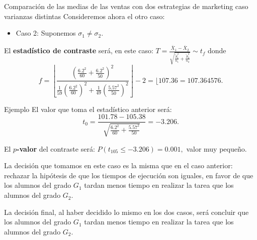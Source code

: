 \documentclass[
  ignorenonframetext,
]{beamer}
\providecommand{\tightlist}{%
  \setlength{\itemsep}{0pt}\setlength{\parskip}{0pt}}
\begin{document}
\begin{frame}{Comparación de las medias de las ventas con dos
estrategias de marketing caso varianzas distintas}
\protect\hypertarget{comparaciuxf3n-de-las-medias-de-las-ventas-con-dos-estrategias-de-marketing-caso-varianzas-distintas}{}
Consideremos ahora el otro caso:

\begin{itemize}
\tightlist
\item
  Caso 2: Suponemos \(\sigma_1\neq \sigma_2\).
\end{itemize}

El \textbf{estadístico de contraste} será, en este caso:
\(T=\frac{\overline{X}_1-\overline{X}_2}{\sqrt{\frac{\widetilde{S}_1^2}{n_1}+\frac{\widetilde{S}_2^2}{n_2}}}\sim t_f\)
donde \[
f=\left\lfloor\frac{ \left( \frac{6.2^2}{60}+\frac{6.2^2}{50}\right)^2}
{\frac1{59}\left(\frac{6.2^2}{60}\right)^2+\frac1{49}\left(\frac{5.57^2}{50}\right)^2}\right\rfloor -2
=\lfloor 107.36=107.364576.
\]
\end{frame}

\begin{frame}{Ejemplo}
\protect\hypertarget{ejemplo}{}
El valor que toma el estadístico anterior será: \[
t_0=\frac{101.78-105.38}{\sqrt{\frac{6.2^2}{60}+\frac{5.57^2}{50}}}=-3.206.
\]

El \textbf{\(p\)-valor} del contraste será:
\(P(t_{105}\leq -3.206)= 0.001,\) valor muy pequeño.

La decisión que tomamos en este caso es la misma que en el caso
anterior: rechazar la hipótesis de que los tiempos de ejecución son
iguales, en favor de que los alumnos del grado \(G_1\) tardan menos
tiempo en realizar la tarea que los alumnos del grado \(G_2\).

La decisión final, al haber decidido lo mismo en los dos casos, será
concluir que los alumnos del grado \(G_1\) tardan menos tiempo en
realizar la tarea que los alumnos del grado \(G_2\).
\end{frame}
\end{document}
